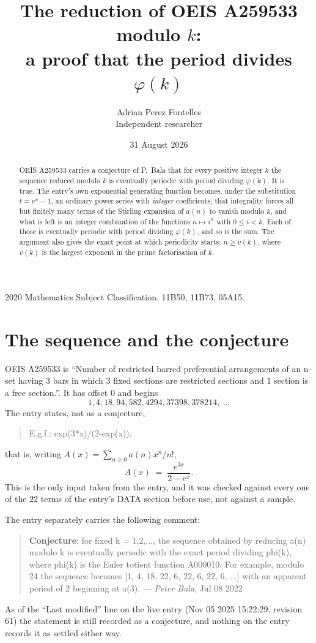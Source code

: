 \documentclass[11pt,a4paper]{article}
\title{The reduction of OEIS A259533 modulo $k$:\\ a proof that the period divides
$\varphi(k)$}
\author{Adrian Perez Fontelles\\ \small Independent researcher}
\date{31 August 2026}
\theoremstyle{plain}
\theoremstyle{definition}
\begin{document}
\maketitle

\begin{abstract}
OEIS A259533 carries a conjecture of P.~Bala that for every positive integer $k$ the
sequence reduced modulo $k$ is eventually periodic with period dividing $\varphi(k)$.
It is true. The entry's own exponential generating function becomes, under the
substitution $t=e^{x}-1$, an ordinary power series with \emph{integer} coefficients;
that integrality forces all but finitely many terms of the Stirling expansion of $a(n)$
to vanish modulo $k$, and what is left is an integer combination of the functions
$n\mapsto i^{n}$ with $0\le i<k$. Each of those is eventually periodic with period
dividing $\varphi(k)$, and so is the sum. The argument also gives the exact point at
which periodicity starts: $n\ge v(k)$, where $v(k)$ is the largest exponent in the
prime factorisation of $k$.
\end{abstract}

\noindent\small 2020 Mathematics Subject Classification. 11B50, 11B73, 05A15.\normalsize

\section{The sequence and the conjecture}

OEIS A259533 is ``Number of restricted barred preferential arrangements of an n-set having 3 bars in which 3 fixed sections are restricted sections and 1 section is a free section.''. It has offset $0$ and begins
\[
1, 4, 18, 94, 582, 4294, 37398, 378214,\ \dots
\]
The entry states, not as a conjecture,
\begin{quote}\small
E.g.f.: exp(3*x)/(2-exp(x)).
\end{quote}
that is, writing $A(x)=\sum_{n\ge 0}a(n)x^{n}/n!$,
\begin{equation}\label{eq:egf}
A(x)\;=\;\frac{e^{3x}}{2-e^{x}}.
\end{equation}
This is the only input taken from the entry, and it was checked against every one of the
$22$ terms of the entry's DATA section before use, not against a sample.

The entry separately carries the following comment:
\begin{quote}\small
\textbf{Conjecture}: for fixed k = 1,2,..., the sequence obtained by reducing a(n) modulo k is eventually periodic with the exact period dividing phi(k), where phi(k) is the Euler totient function A000010. For example, modulo 24 the sequence becomes [1, 4, 18, 22, 6, 22, 6, 22, 6, ...] with an apparent period of 2 beginning at a(3). --- \emph{Peter Bala}, Jul 08 2022
\end{quote}
As of the ``Last modified'' line on the live entry (Nov 05 2025 15:22:29, revision
61) the statement is still recorded as a conjecture, and nothing on the entry
records it as settled either way.
\end{document}
